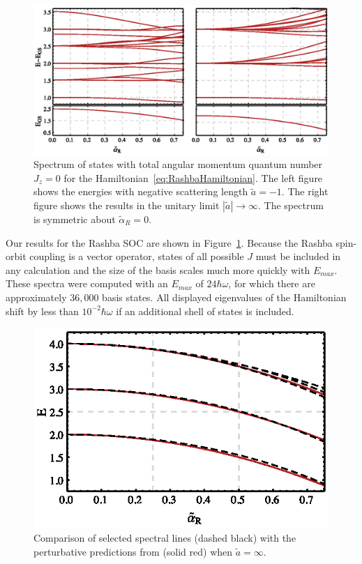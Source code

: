 \documentclass[%
 onecolumn,
 notitlepage,
 amsmath,amssymb,
 aps,
]{revtex4-1}
\begin{document}
\begin{figure}
\includegraphics{Figures/RashbaSpectrum}
\caption{\label{fig:RashbaSpectrum} Spectrum of states with total angular momentum quantum number $J_z=0$ for the Hamiltonian~\eqref{eq:RashbaHamiltonian}. The left figure shows the energies with negative scattering length $\tilde{a}=-1$. The right figure shows the results in the unitary limit $|\tilde{a}|\rightarrow\infty$. The spectrum is symmetric about $\tilde{\alpha}_R=0$.} 
\end{figure}


Our results for the Rashba SOC are shown in Figure~\ref{fig:RashbaSpectrum}. Because the Rashba spin-orbit coupling is a vector operator, states of all possible $J$ must be included in any calculation and the size of the basis scales much more quickly with $E_{max}$. These spectra were computed with an $E_{max}$ of $24\hbar\omega$, for which there are approximately $36,000$ basis states. All displayed eigenvalues of the Hamiltonian shift by less than $10^{-2}\hbar\omega$ if an additional shell of states is included.

\begin{figure}
\includegraphics{Figures/PerturbativeComparison}
\caption{\label{fig:ComparisonSpectrum} Comparison of selected spectral lines (dashed black) with the perturbative predictions from \cite{PhysRevA.89.033606} (solid red) when $\tilde{a}=\infty$. }
\end{figure}
\end{document}
